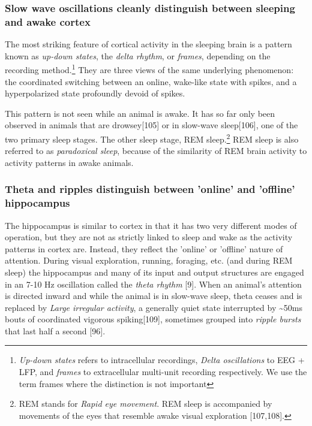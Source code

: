 \documentclass[]{article}
\begin{document}
\subsubsection{Slow wave oscillations cleanly distinguish between
sleeping and awake cortex}

The most striking feature of cortical activity in the sleeping brain is
a pattern known as \emph{up-down states}, the \emph{delta rhythm}, or
\emph{frames}, depending on the recording method.\footnote{\emph{Up-down
  states} refers to intracellular recordings, \emph{Delta oscillations}
  to EEG + LFP, and \emph{frames} to extracellular multi-unit recording
  respectively. We use the term frames where the distinction is not
  important} They are three views of the same underlying phenomenon: the
coordinated switching between an online, wake-like state with spikes,
and a hyperpolarized state profoundly devoid of spikes.

This pattern is not seen while an animal is awake. It has so far only
been observed in animals that are drowsey{[}105{]} or in slow-wave
sleep{[}106{]}, one of the two primary sleep stages. The other sleep
stage, REM sleep.\footnote{REM stands for \emph{Rapid eye movement}. REM
  sleep is accompanied by movements of the eyes that resemble awake
  visual exploration {[}107,108{]}.} REM sleep is also referred to as
\emph{paradoxical sleep}, because of the similarity of REM brain
activity to activity patterns in awake animals.

\subsubsection{Theta and ripples distinguish between 'online' and
'offline' hippocampus}

The hippocampus is similar to cortex in that it has two very different
modes of operation, but they are not as strictly linked to sleep and
wake as the activity patterns in cortex are. Instead, they reflect the
'online' or 'offline' nature of attention. During visual exploration,
running, foraging, etc. (and during REM sleep) the hippocampus and many
of its input and output structures are engaged in an 7-10 Hz oscillation
called the \emph{theta rhythm} {[}9{]}. When an animal's attention is
directed inward and while the animal is in slow-wave sleep, theta ceases
and is replaced by \emph{Large irregular activity}, a generally quiet
state interrupted by \textasciitilde{}50ms bouts of coordinated vigorous
spiking{[}109{]}, sometimes grouped into \emph{ripple bursts} that last
half a second {[}96{]}.
\end{document}

